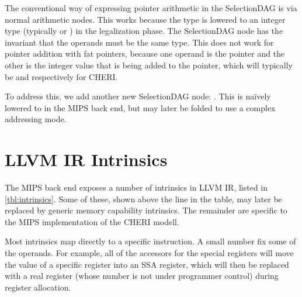 The conventional way of expressing pointer arithmetic in the SelectionDAG is via normal arithmetic nodes.
This works because the  type is lowered to an integer type (typically  or ) in the legalization phase.
The  SelectionDAG node has the invariant that the operands must be the same type.
This does not work for pointer addition with fat pointers, because one operand is the pointer and the other is the integer value that is being added to the pointer, which will typically be  and  respectively for CHERI.

To address this, we add another new SelectionDAG node: .
This is na{\"i}vely lowered to  in the MIPS back end, but may later be folded to use a complex addressing mode.

\section{LLVM IR Intrinsics}

The MIPS back end exposes a number of intrinsics in LLVM IR, listed in \autoref{tbl:intrinsics}.
Some of these, shown above the line in the table, may later be replaced by generic memory capability intrinsics.
The remainder are specific to the MIPS implementation of the CHERI modell.

Most intrinsics map directly to a specific instruction.
A small number fix some of the operands.
For example, all of the accessors for the special registers will move the value of a specific register into an SSA register, which will then be replaced with a real register (whose number is not under programmer control) during register allocation.

